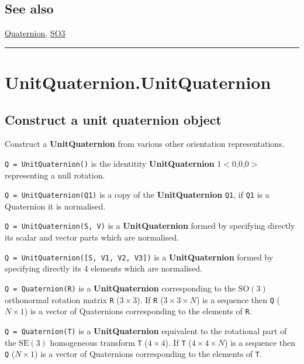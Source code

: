 \subsection*{See also}


\hyperlink{Quaternion}{\color{blue} Quaternion}, \hyperlink{SO3}{\color{blue} SO3}

\vspace{1.5ex}\hrule

\hypertarget{UnitQuaternion.UnitQuaternion}{\section*{UnitQuaternion.UnitQuaternion}}
\subsection*{Construct a unit quaternion object}


Construct a \textbf{\color{red} UnitQuaternion} from various other orientation representations.



\texttt{Q = UnitQuaternion()} is the identitity \textbf{\color{red} UnitQuaternion} 1$<$0,0,0$>$ representing a null rotation.



\texttt{Q = UnitQuaternion(Q1)} is a copy of the \textbf{\color{red} UnitQuaternion} \texttt{Q1}, if \texttt{Q1} is a
Quaternion it is normalised.



\texttt{Q = UnitQuaternion(S, V)} is a \textbf{\color{red} UnitQuaternion} formed by specifying directly
its scalar and vector parts which are normalised.



\texttt{Q = UnitQuaternion([S, V1, V2, V3])} is a \textbf{\color{red} UnitQuaternion} formed by specifying
directly its 4 elements which are normalised.



\texttt{Q = Quaternion(R)} is a \textbf{\color{red} UnitQuaternion} corresponding to the $\mbox{SO}(3)$
orthonormal rotation matrix \texttt{R} ($3 \times 3$).  If \texttt{R} ($3 \times 3 \times N$) is a sequence then \texttt{Q}
($N \times 1$) is a vector of Quaternions corresponding to the elements of \texttt{R}.



\texttt{Q = Quaternion(T)} is a \textbf{\color{red} UnitQuaternion} equivalent to the rotational part
of the $\mbox{SE}(3)$ homogeneous transform \texttt{T} ($4 \times 4$). If \texttt{T} ($4 \times 4 \times N$) is a sequence
then \texttt{Q} ($N \times 1$) is a vector of Quaternions corresponding to the elements of
\texttt{T}.


